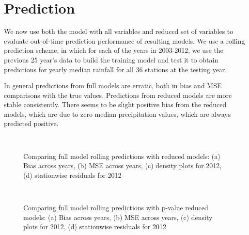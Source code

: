 \documentclass[fleqn,11pt]{article}
\begin{document}
\doublespacing
\section{Prediction}
We now use both the model with all variables and reduced set of variables to evaluate out-of-time prediction performance of resulting models. We use a rolling prediction scheme, in which for each of the years in 2003-2012, we use the previous 25 year's data to build the training model and test it to obtain predictions for yearly median rainfall for all 36 stations at the testing year.

In general predictions from full models are erratic, both in bias and MSE comparisons with the true values. Predictions from reduced models are more stable consistently. There seems to be slight positive bias from the reduced models, which are due to zero median precipitation values, which are always predicted positive.

\begin{figure*}
\captionsetup{justification=centering, font=footnotesize}
\begin{center}
\\
\caption{Comparing full model rolling predictions with reduced models: (a) Bias across years, (b) MSE across years, (c) density plots for 2012, (d) stationwise residuals for 2012}
\end{center}
\label{fig:prepost}
\end{figure*}

\begin{figure*}
\captionsetup{justification=centering, font=footnotesize}
\begin{center}
\\
\caption{Comparing full model rolling predictions with p-value reduced models: (a) Bias across years, (b) MSE across years, (c) density plots for 2012, (d) stationwise residuals for 2012}
\end{center}
\label{fig:prepostpval}
\end{figure*}
\end{document}
